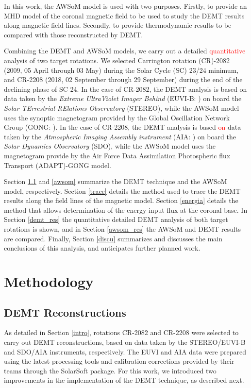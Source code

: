 \documentclass[namedreferences]{solarphysics}
\def\edit#1{\textcolor{Red}{#1}}
\begin{document}
\begin{article}
{In this work, the AWSoM model is used with two purposes. Firstly, to provide an MHD model of the coronal magnetic field to be used to study the DEMT results along magnetic field lines. Secondly, to provide thermodynamic results to be compared with those reconstructed by DEMT.}

{Combining the DEMT and AWSoM models, we carry out a detailed \edit{quantitative} analysis of two target rotations. We selected Carrington rotation} (CR)-2082 (2009, 05 April through 03 May) during the Solar Cycle (SC) 23/24 minimum, and CR-2208 (2018, 02 September through 29 September) during {the end of the declining} phase of SC 24. {In the case of CR-2082, the DEMT analysis is based on data} taken by the \textit{Extreme UltraViolet Imager Behind} {(EUVI-B: \citealt{wuelser_2004})} on board the \textit{Solar TErrestrial RElations Observatory} {(STEREO), while the AWSoM model uses the synoptic magnetogram provided by the Global Oscillation Network Group (GONG: \citealt{gong}). In the case of CR-2208, the DEMT analysis is based \edit{on} data taken} by the \textit{Atmospheric Imaging Assembly instrument} {(AIA: \citealt{lemen_2012})} on board the \textit{Solar Dynamics Observatory} {(SDO), while the AWSoM model uses the magnetogram provide by the Air Force Data Assimilation Photospheric flux Transport (ADAPT)-GONG model.}

Section \ref{demt} and \ref{awsom} {summarize the DEMT technique and the AWSoM model, respectively.} Section \ref{trace} {details} the method used to trace {the DEMT} results along the field lines of the magnetic model. Section \ref{energia} details {the method that allows determination of the energy input flux at the coronal base.} In Section \ref{demt_res} the quantitative {detailed DEMT analysis of both target rotations is shown,} and in Section \ref{awsom_res} the AWSoM and DEMT results are compared. {Finally, Section} \ref{discu} summarizes and discusses the main conclusions of this analysis, and anticipates further planned work. 

\section{Methodology}\label{meto}   

\subsection{{DEMT Reconstructions}}\label{demt}

{As detailed in Section \ref{intro}, rotations CR-2082 and CR-2208 were selected to carry out DEMT reconstructions, based on data taken by the STEREO/EUVI-B and SDO/AIA instruments, respectively.} The EUVI and AIA data were prepared using the latest processing tools and calibration corrections provided by their teams through the SolarSoft package. For this work, we introduced two improvements in the implementation of the DEMT technique, as described next.


\end{article}
\end{document}
